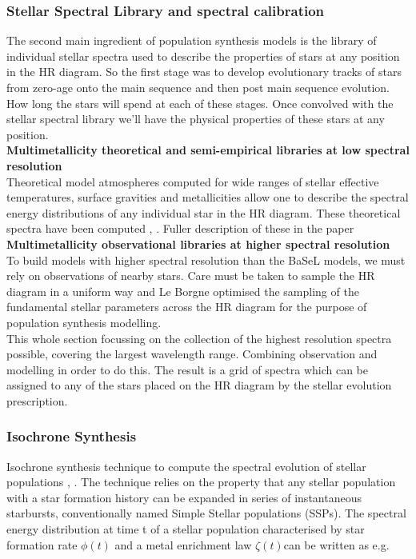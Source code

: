 \documentclass{literature}
\begin{document}
\subsubsection{Stellar Spectral Library and spectral calibration}
The second main ingredient of population synthesis models is the library of individual stellar spectra used to describe the properties of stars at any position in the HR diagram. So the first stage was to develop evolutionary tracks of stars from zero-age onto the main sequence and then post main sequence evolution. How long the stars will spend at each of these stages. Once convolved with the stellar spectral library we'll have the physical properties of these stars at any position. \\

\textbf{Multimetallicity theoretical and semi-empirical libraries at low spectral resolution} \\ 
Theoretical model atmospheres computed for wide ranges of stellar effective temperatures, surface gravities and metallicities allow one to describe the spectral energy distributions of any individual star in the HR diagram. These theoretical spectra have been computed \citep{Lejeune1997}, \citep{Lejeune1997a}. Fuller description of these in the paper   \\ 

\textbf{Multimetallicity observational libraries at higher spectral resolution} \\
To build models with higher spectral resolution than the BaSeL models, we must rely on observations of nearby stars. Care must be taken to sample the HR diagram in a uniform way and Le Borgne \citep{Borgne2003} optimised the sampling of the fundamental stellar parameters across the HR diagram for the purpose of population synthesis modelling. \\ 

This whole section focussing on the collection of the highest resolution spectra possible, covering the largest wavelength range. Combining observation and modelling in order to do this. The result is a grid of spectra which can be assigned to any of the stars placed on the HR diagram by the stellar evolution prescription. 

\subsubsection{Isochrone Synthesis}
Isochrone synthesis technique to compute the spectral evolution of stellar populations \citep{Charlot1991}, \citep{A1993}. The technique relies on the property that any stellar population with a star formation history can be expanded in series of instantaneous starbursts, conventionally named Simple Stellar populations (SSPs). The spectral energy distribution at time t of a stellar population characterised by star formation rate $\phi (t)$ and a metal enrichment law $\zeta (t) $can be written as e.g.
\end{document}
